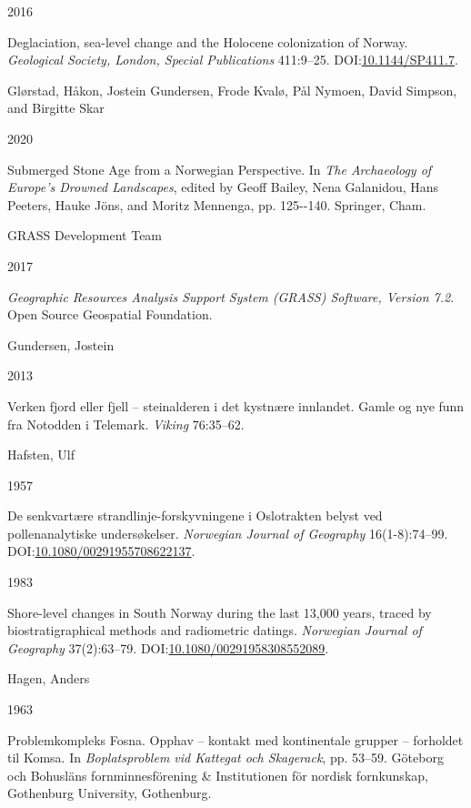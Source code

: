 \documentclass[
]{article}
\newlength{\cslhangindent}
\newlength{\csllabelwidth}
\newlength{\cslentryspacingunit} %
\newenvironment{CSLReferences}[2] %
 {%
  \setlength{\parindent}{0pt}
  \ifodd #1
  \let\oldpar\par
  \def\par{\hangindent=\cslhangindent\oldpar}
  \fi
  \setlength{\parskip}{#2\cslentryspacingunit}
 }%
 {}
\newcommand{\CSLBlock}[1]{#1\hfill\break}
\newcommand{\CSLLeftMargin}[1]{\parbox[t]{\csllabelwidth}{#1}}
\newcommand{\CSLRightInline}[1]{\parbox[t]{\linewidth - \csllabelwidth}{#1}\break}
\begin{document}
\begin{CSLReferences}{0}{0}
\leavevmode{}%
\CSLLeftMargin{ 2016 }
\CSLRightInline{Deglaciation, sea-level change and the Holocene colonization of Norway. \emph{Geological Society, London, Special Publications} 411:9--25. DOI:\href{https://doi.org/10.1144/SP411.7}{10.1144/SP411.7}.}

\leavevmode{}%
\CSLBlock{Glørstad, Håkon, Jostein Gundersen, Frode Kvalø, Pål Nymoen, David Simpson, and Birgitte Skar}
\CSLLeftMargin{ 2020}
\CSLRightInline{{Submerged Stone Age from a Norwegian Perspective}. In \emph{{The Archaeology of Europe's Drowned Landscapes}}, edited by Geoff Bailey, Nena Galanidou, Hans Peeters, Hauke Jöns, and Moritz Mennenga, pp. 125-\/-140. Springer, Cham.}

\leavevmode{}%
\CSLBlock{GRASS Development Team}
\CSLLeftMargin{ 2017}
\CSLRightInline{\emph{{Geographic Resources Analysis Support System (GRASS) Software, Version 7.2}}. Open Source Geospatial Foundation.}

\leavevmode{}%
\CSLBlock{Gundersen, Jostein}
\CSLLeftMargin{ 2013}
\CSLRightInline{{Verken fjord eller fjell -- steinalderen i det kystnære innlandet. Gamle og nye funn fra Notodden i Telemark}. \emph{Viking} 76:35--62.}

\leavevmode{}%
\CSLBlock{Hafsten, Ulf}
\CSLLeftMargin{ 1957}
\CSLRightInline{{De senkvartære strandlinje-forskyvningene i Oslotrakten belyst ved pollenanalytiske undersøkelser}. \emph{Norwegian Journal of Geography} 16(1-8):74--99. DOI:\href{https://doi.org/10.1080/00291955708622137}{10.1080/00291955708622137}.}

\leavevmode{}%
\CSLLeftMargin{ 1983 }
\CSLRightInline{{Shore-level changes in South Norway during the last 13,000 years, traced by biostratigraphical methods and radiometric datings}. \emph{Norwegian Journal of Geography} 37(2):63--79. DOI:\href{https://doi.org/10.1080/00291958308552089}{10.1080/00291958308552089}.}

\leavevmode{}%
\CSLBlock{Hagen, Anders}
\CSLLeftMargin{ 1963}
\CSLRightInline{{Problemkompleks Fosna. Opphav -- kontakt med kontinentale grupper -- forholdet til Komsa}. In \emph{{Boplatsproblem vid Kattegat och Skagerack}}, pp. 53--59. Göteborg och Bohusläns fornminnesförening \& Institutionen för nordisk fornkunskap, Gothenburg University, Gothenburg.}


\end{CSLReferences}
\end{document}
